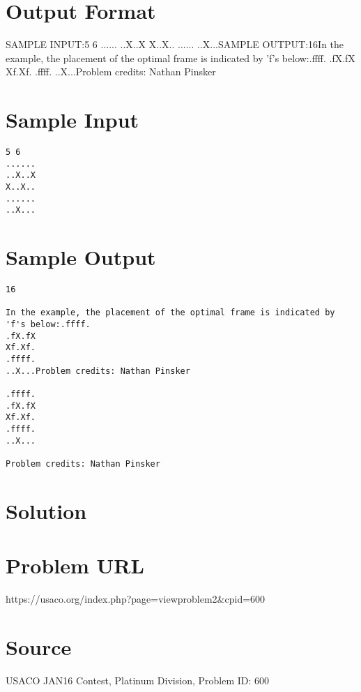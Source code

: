 \documentclass[12pt]{article}
\begin{document}
\section*{Output Format}
SAMPLE INPUT:5 6
......
..X..X
X..X..
......
..X...SAMPLE OUTPUT:16In the example, the placement of the optimal frame is indicated by 'f's below:.ffff.
.fX.fX
Xf.Xf.
.ffff.
..X...Problem credits: Nathan Pinsker

\section*{Sample Input}
\begin{verbatim}
5 6
......
..X..X
X..X..
......
..X...
\end{verbatim}

\section*{Sample Output}
\begin{verbatim}
16

In the example, the placement of the optimal frame is indicated by 'f's below:.ffff.
.fX.fX
Xf.Xf.
.ffff.
..X...Problem credits: Nathan Pinsker

.ffff.
.fX.fX
Xf.Xf.
.ffff.
..X...

Problem credits: Nathan Pinsker
\end{verbatim}

\section*{Solution}


\section*{Problem URL}
https://usaco.org/index.php?page=viewproblem2&cpid=600

\section*{Source}
USACO JAN16 Contest, Platinum Division, Problem ID: 600
\end{document}
